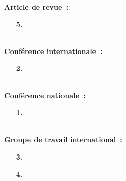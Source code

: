 \renewcommand{\thechapter}{\roman{chapter}}
\setcounter{chapter}{6}
\setcounter{figure}{0}


\textbf{Article de revue~:} ~\\
\vspace{-0.1cm}
\begin{itemize}
\item[\textbf{5.}  ] 
\end{itemize}
~\\
\textbf{Conférence internationale~:} ~\\
\vspace{-0.2cm}
\begin{itemize}
\item[\textbf{2.}  ] 
\end{itemize}
 ~\\
\textbf{Conférence nationale~:} ~\\
\vspace{-0.2cm}
\begin{itemize}
\item[\textbf{1.} ] 
\end{itemize}
~\\
\textbf{Groupe de travail international~:} ~\\
\vspace{-0.2cm}
\begin{itemize}
\item[\textbf{3.}  ] 
\item[\textbf{4.}  ] 
\end{itemize}
~\\
